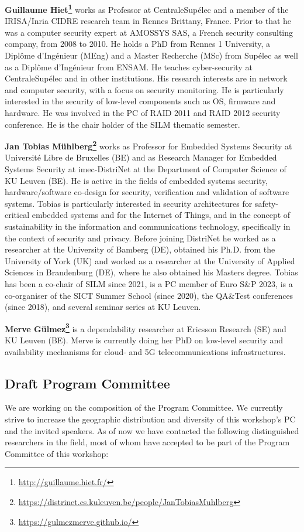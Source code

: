 \documentclass[a4paper,11pt]{article}
\begin{document}
\textbf{Guillaume Hiet\footnote{\url{http://guillaume.hiet.fr/}}} works as
Professor at CentraleSupélec and a member of the IRISA/Inria CIDRE research
team in Rennes Brittany, France. Prior to that he was a computer security
expert at AMOSSYS SAS, a French security consulting company, from 2008 to
2010. He holds a PhD from Rennes 1 University, a Diplôme d'Ingénieur (MEng)
and a Master Recherche (MSc) from Supélec as well as a Diplôme d'Ingénieur
from ENSAM. He teaches cyber-security at CentraleSupélec and in other
institutions. His research interests are in network and computer security,
with a focus on security monitoring. He is particularly interested in the
security of low-level components such as OS, firmware and hardware. He was
involved in the PC of RAID 2011 and RAID 2012 security conference. He is
the chair holder of the SILM thematic semester.

\textbf{Jan Tobias
M\"uhlberg\footnote{\url{https://distrinet.cs.kuleuven.be/people/JanTobiasMuhlberg}}}
works as Professor for Embedded Systems Security at Universit\'e Libre de
Bruxelles (BE) and as Research Manager for Embedded Systems Security at
imec-DistriNet at the Department of Computer Science of KU Leuven (BE). He
is active in the fields of embedded systems security, hardware/software
co-design for security, verification and validation of software systems.
Tobias is particularly interested in security architectures for
safety-critical embedded systems and for the Internet of Things, and in the
concept of sustainability in the information and communications technology,
specifically in the context of security and privacy. Before joining
DistriNet he worked as a researcher at the University of Bamberg (DE),
obtained his Ph.D. from the University of York (UK) and worked as a
researcher at the University of Applied Sciences in Brandenburg (DE), where
he also obtained his Masters degree. Tobias has been a co-chair of SILM
since 2021, is a PC member of Euro S\&P 2023, is a co-organiser of the SICT
Summer School (since 2020), the QA\&Test conferences (since 2018), and
several seminar series at KU Leuven.

\textbf{Merve
G\"ulmez\footnote{\url{https://gulmezmerve.github.io/}}}
is a dependability researcher at Ericsson Research (SE) and KU Leuven (BE).
Merve is currently doing her PhD on low-level security and availability
mechanisms for cloud- and 5G telecommunications infrastructures.


\subsection{Draft Program Committee}
%
We are working on the composition of the Program Committee. We currently
strive to increase the geographic distribution and diversity of this
workshop's PC and the invited speakers. As of now we have contacted the
following distinguished researchers in the field, most of whom have
accepted to be part of the Program Committee of this workshop:
\end{document}
